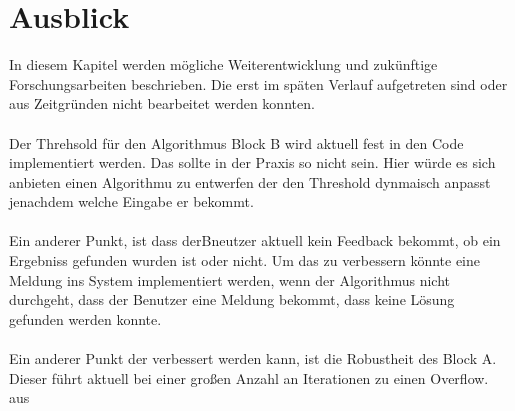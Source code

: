 \documentclass{article}
\begin{document}
    \section{Ausblick}
    In diesem Kapitel werden mögliche Weiterentwicklung und zukünftige Forschungsarbeiten beschrieben. 
    Die erst im späten Verlauf aufgetreten sind oder aus Zeitgründen nicht bearbeitet werden konnten.\\
    \\
    Der Threhsold für den Algorithmus Block B wird aktuell fest in den Code implementiert werden. 
    Das sollte in der Praxis so nicht sein. 
    Hier würde es sich anbieten einen Algorithmu zu entwerfen der den Threshold dynmaisch anpasst jenachdem welche Eingabe er bekommt.\\
    \\
    Ein anderer Punkt, ist dass derBneutzer aktuell kein Feedback bekommt, ob ein Ergebniss gefunden wurden ist oder nicht.
    Um das zu verbessern könnte eine Meldung ins System implementiert werden, wenn der Algorithmus nicht durchgeht, dass der Benutzer eine Meldung bekommt, dass keine Lösung gefunden werden konnte.\\
    \\
    Ein anderer Punkt der verbessert werden kann, ist die Robustheit des Block A. 
    Dieser führt aktuell bei einer großen Anzahl an Iterationen zu einen Overflow. 
    aus
    \newpage
    \renewcommand{\refname}{}
\end{document}
